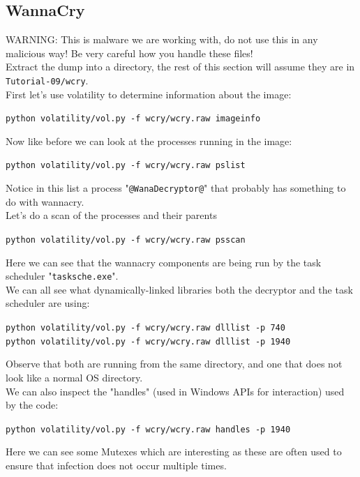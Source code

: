 \documentclass{article}
\begin{document}
\subsection{WannaCry}
WARNING: This is malware we are working with, do not use this in any
malicious way! Be very careful how you handle these files!\\

\noindent Extract the dump into a directory, the rest of this section will assume they are in \lstinline{Tutorial-09/wcry}.\\

\noindent First let's use volatility to determine information about the image:
\begin{center}
    \lstinline{python volatility/vol.py -f wcry/wcry.raw imageinfo}
\end{center}
\noindent Now like before we can look at the processes running in the image:
\begin{center}
    \lstinline{python volatility/vol.py -f wcry/wcry.raw pslist}
\end{center}
\noindent Notice in this list a process "\lstinline{@WanaDecryptor@}" that probably has something to do with wannacry.\\

\noindent Let's do a scan of the processes and their parents
\begin{center}
    \lstinline{python volatility/vol.py -f wcry/wcry.raw psscan}
\end{center}
\noindent Here we can see that the wannacry components are being run by the task scheduler "\lstinline{tasksche.exe}".\\

\noindent We can all see what dynamically-linked libraries both the decryptor and the task scheduler are using:
\begin{center}
    \lstinline{python volatility/vol.py -f wcry/wcry.raw dlllist -p 740}\\
    \lstinline{python volatility/vol.py -f wcry/wcry.raw dlllist -p 1940}
\end{center}
\noindent Observe that both are running from the same directory, and one that does
not look like a normal OS directory.\\

\noindent We can also inspect the "handles" (used in Windows APIs for interaction) used by the code:
\begin{center}
    \lstinline{python volatility/vol.py -f wcry/wcry.raw handles -p 1940}
\end{center}
\noindent Here we can see some Mutexes which are interesting as these are often used
to ensure that infection does not occur multiple times.\\
\end{document}
